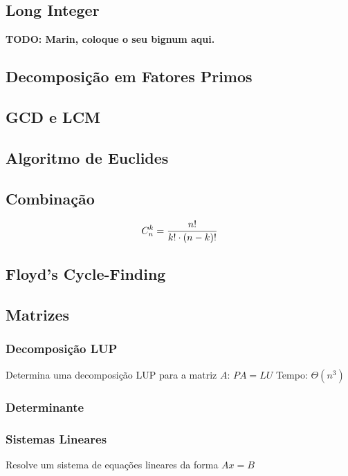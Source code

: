 \documentclass[12pt,a4paper]{article}
\begin{document}
		\subsection{Long Integer}
			\textbf{TODO: Marin, coloque o seu bignum aqui.}
		\subsection{Decomposição em Fatores Primos}
			
		\subsection{GCD e LCM}
			
		\subsection{Algoritmo de Euclides}
			
		\subsection{Combinação}
			\[ C_n^k = {n! \over {k! \cdot (n - k)!}} \]
			
		\subsection{Floyd's Cycle-Finding}
			
		\subsection{Matrizes}
			\subsubsection{Decomposição LUP}
				Determina uma decomposição LUP para a matriz \(A\): \( PA = LU \)
				Tempo: \( \Theta(n^3) \)
				
			\subsubsection{Determinante}
				
			\subsubsection{Sistemas Lineares}
				Resolve um sistema de equações lineares da forma \(Ax = B\)
				
\end{document}

